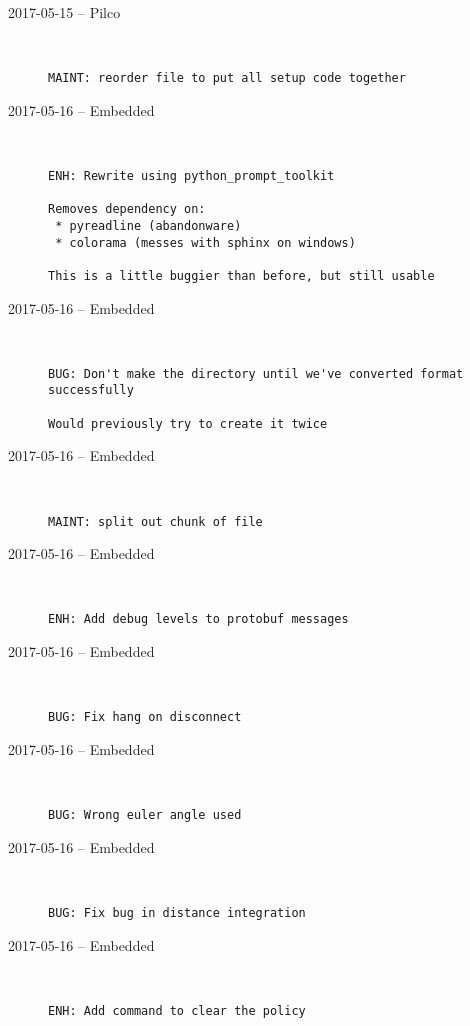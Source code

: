 \begin{description}
  \item[2017-05-15 -- Pilco] \hfill \
\begin{lstlisting}
MAINT: reorder file to put all setup code together
\end{lstlisting}


  \item[2017-05-16 -- Embedded] \hfill \
\begin{lstlisting}
ENH: Rewrite using python_prompt_toolkit

Removes dependency on:
 * pyreadline (abandonware)
 * colorama (messes with sphinx on windows)

This is a little buggier than before, but still usable
\end{lstlisting}


  \item[2017-05-16 -- Embedded] \hfill \
\begin{lstlisting}
BUG: Don't make the directory until we've converted format successfully

Would previously try to create it twice
\end{lstlisting}


  \item[2017-05-16 -- Embedded] \hfill \
\begin{lstlisting}
MAINT: split out chunk of file
\end{lstlisting}


  \item[2017-05-16 -- Embedded] \hfill \
\begin{lstlisting}
ENH: Add debug levels to protobuf messages
\end{lstlisting}


  \item[2017-05-16 -- Embedded] \hfill \
\begin{lstlisting}
BUG: Fix hang on disconnect
\end{lstlisting}


  \item[2017-05-16 -- Embedded] \hfill \
\begin{lstlisting}
BUG: Wrong euler angle used
\end{lstlisting}


  \item[2017-05-16 -- Embedded] \hfill \
\begin{lstlisting}
BUG: Fix bug in distance integration
\end{lstlisting}


  \item[2017-05-16 -- Embedded] \hfill \
\begin{lstlisting}
ENH: Add command to clear the policy
\end{lstlisting}



\end{description}
